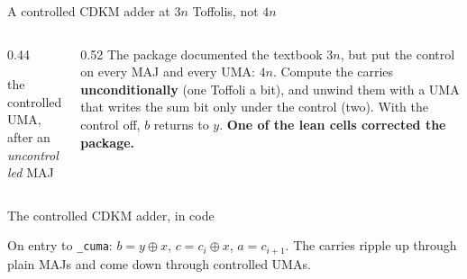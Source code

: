 \documentclass[aspectratio=169,11pt]{beamer}
\newcommand{\code}[2][]{}
\newcommand{\oplusat}[2]{\draw[thick,color=body] (#1,#2) circle (1.6mm);
  \draw[thick,color=body] (#1-0.16,#2) -- (#1+0.16,#2); \draw[thick,color=body] (#1,#2-0.16) -- (#1,#2+0.16);}
\begin{document}
\setcounter{framenumber}{186}
\begin{frame}{A controlled CDKM adder at $3n$ Toffolis, not $4n$}
  \begin{columns}[c]
    \begin{column}{0.44\textwidth}
      \centering
      \par
      \vskip1mm
      {\scriptsize the controlled UMA, after an \emph{uncontrolled} MAJ}
    \end{column}
    \begin{column}{0.52\textwidth}
      \small The package documented the textbook $3n$, but put the control on every MAJ and every UMA: $4n$.
      \vskip2mm
      Compute the carries \textbf{unconditionally} (one Toffoli a bit), and unwind them with a UMA that writes the sum bit only under the control (two). With the control off, $b$ returns to $y$.
      \vskip2mm
      {\color{cverm}\bfseries One of the lean cells corrected the package.}
    \end{column}
  \end{columns}
\end{frame}

\setcounter{framenumber}{187}
\begin{frame}[fragile]{The controlled CDKM adder, in code}
  \code[basicstyle=\ttfamily\scriptsize]{cdkm_cadd.py}
  \vskip2mm
  {\small On entry to \texttt{\_cuma}: $b=y\oplus x$, $c=c_i\oplus x$, $a=c_{i+1}$. The carries ripple up through plain MAJs and come down through controlled UMAs.}
\end{frame}
\end{document}
